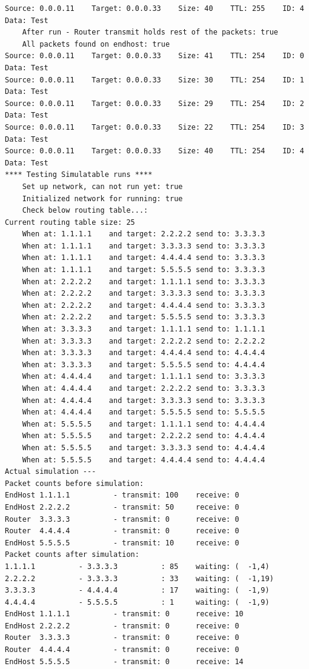 \begin{lstlisting}
Source: 0.0.0.11	Target: 0.0.0.33	Size: 40	TTL: 255	ID: 4	Data: Test
	After run - Router transmit holds rest of the packets: true
	All packets found on endhost: true
Source: 0.0.0.11	Target: 0.0.0.33	Size: 41	TTL: 254	ID: 0	Data: Test
Source: 0.0.0.11	Target: 0.0.0.33	Size: 30	TTL: 254	ID: 1	Data: Test
Source: 0.0.0.11	Target: 0.0.0.33	Size: 29	TTL: 254	ID: 2	Data: Test
Source: 0.0.0.11	Target: 0.0.0.33	Size: 22	TTL: 254	ID: 3	Data: Test
Source: 0.0.0.11	Target: 0.0.0.33	Size: 40	TTL: 254	ID: 4	Data: Test
**** Testing Simulatable runs ****
	Set up network, can not run yet: true
	Initialized network for running: true
	Check below routing table...: 
Current routing table size: 25
	When at: 1.1.1.1	and target: 2.2.2.2	send to: 3.3.3.3
	When at: 1.1.1.1	and target: 3.3.3.3	send to: 3.3.3.3
	When at: 1.1.1.1	and target: 4.4.4.4	send to: 3.3.3.3
	When at: 1.1.1.1	and target: 5.5.5.5	send to: 3.3.3.3
	When at: 2.2.2.2	and target: 1.1.1.1	send to: 3.3.3.3
	When at: 2.2.2.2	and target: 3.3.3.3	send to: 3.3.3.3
	When at: 2.2.2.2	and target: 4.4.4.4	send to: 3.3.3.3
	When at: 2.2.2.2	and target: 5.5.5.5	send to: 3.3.3.3
	When at: 3.3.3.3	and target: 1.1.1.1	send to: 1.1.1.1
	When at: 3.3.3.3	and target: 2.2.2.2	send to: 2.2.2.2
	When at: 3.3.3.3	and target: 4.4.4.4	send to: 4.4.4.4
	When at: 3.3.3.3	and target: 5.5.5.5	send to: 4.4.4.4
	When at: 4.4.4.4	and target: 1.1.1.1	send to: 3.3.3.3
	When at: 4.4.4.4	and target: 2.2.2.2	send to: 3.3.3.3
	When at: 4.4.4.4	and target: 3.3.3.3	send to: 3.3.3.3
	When at: 4.4.4.4	and target: 5.5.5.5	send to: 5.5.5.5
	When at: 5.5.5.5	and target: 1.1.1.1	send to: 4.4.4.4
	When at: 5.5.5.5	and target: 2.2.2.2	send to: 4.4.4.4
	When at: 5.5.5.5	and target: 3.3.3.3	send to: 4.4.4.4
	When at: 5.5.5.5	and target: 4.4.4.4	send to: 4.4.4.4
Actual simulation ---
Packet counts before simulation:
EndHost 1.1.1.1          - transmit: 100    receive: 0     
EndHost 2.2.2.2          - transmit: 50     receive: 0     
Router  3.3.3.3          - transmit: 0      receive: 0     
Router  4.4.4.4          - transmit: 0      receive: 0     
EndHost 5.5.5.5          - transmit: 10     receive: 0     
Packet counts after simulation:
1.1.1.1          - 3.3.3.3          : 85    waiting: (  -1,4)
2.2.2.2          - 3.3.3.3          : 33    waiting: (  -1,19)
3.3.3.3          - 4.4.4.4          : 17    waiting: (  -1,9)
4.4.4.4          - 5.5.5.5          : 1     waiting: (  -1,9)
EndHost 1.1.1.1          - transmit: 0      receive: 10    
EndHost 2.2.2.2          - transmit: 0      receive: 0     
Router  3.3.3.3          - transmit: 0      receive: 0     
Router  4.4.4.4          - transmit: 0      receive: 0     
EndHost 5.5.5.5          - transmit: 0      receive: 14   
\end{lstlisting}

